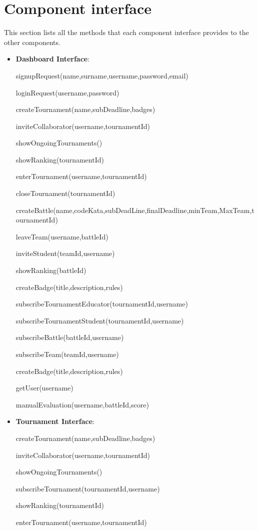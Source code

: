\section{Component interface}
This section lists all the methods that each component interface provides to the other components.
\begin{itemize}
    \item \textbf{Dashboard Interface}:
    
signupRequest(name,surname,username,password,email)  

loginRequest(username,password)  

createTournament(name,subDeadline,badges)  

inviteCollaborator(username,tournamentId) 

showOngoingTournaments()  

showRanking(tournamentId)  

enterTournament(username,tournamentId)  

closeTournament(tournamentId)  

createBattle(name,codeKata,subDeadLine,finalDeadline,minTeam,MaxTeam,tournamentId)  

leaveTeam(username,battleId)  

inviteStudent(teamId,username)  

showRanking(battleId)  

createBadge(title,description,rules)  

subscribeTournamentEducator(tournamentId,username)  

subscribeTournamentStudent(tournamentId,username)  

subscribeBattle(battleId,username)  

subscribeTeam(teamId,username)  

createBadge(title,description,rules)  

getUser(username)  

manualEvaluation(username,battleId,score) 

\item\textbf{Tournament Interface}:

createTournament(name,subDeadline,badges)

inviteCollaborator(username,tournamentId)

showOngoingTournaments()

subscribeTournament(tournamentId,username)

showRanking(tournamentId)

enterTournament(username,tournamentId)


\end{itemize}
